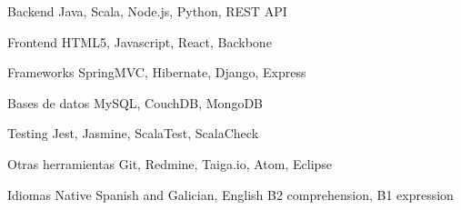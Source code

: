 


\begin{cvskills}


\cvskill
{Backend} %
{Java, Scala, Node.js, Python, REST API} %


\cvskill
{Frontend} %
{HTML5, Javascript, React, Backbone} %


\cvskill
{Frameworks} %
{SpringMVC, Hibernate, Django, Express} %


\cvskill
{Bases de datos} %
{MySQL, CouchDB, MongoDB} %


\cvskill
{Testing} %
{Jest, Jasmine, ScalaTest, ScalaCheck} %


\cvskill
{Otras herramientas} %
{Git, Redmine, Taiga.io, Atom, Eclipse} %


\cvskill
{Idiomas} %
{Native Spanish and Galician, English B2 comprehension, B1 expression} %


\end{cvskills}